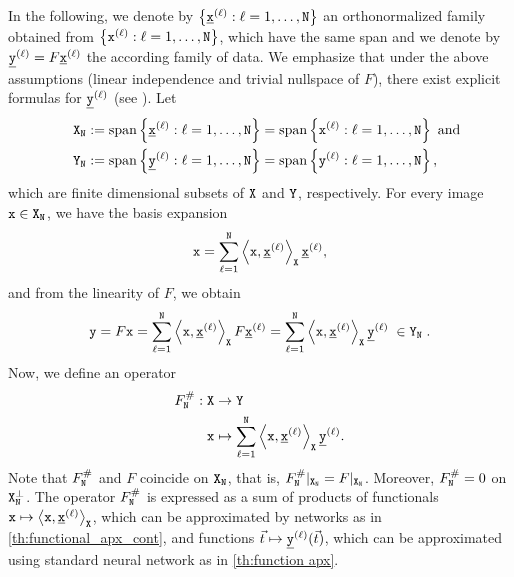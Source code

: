 \documentclass[10pt]{article}
\numberwithin{equation}{section}
\theoremstyle{nonumberplain}
\newcommand{\set}[1]{\left\{#1\right\}}
\newcommand{\inner}[2]{\left<#1,#2\right>}
\newcommand{\bt}{\vec{t}}
\newcommand{\X}{{\tt X}}
\newcommand{\Y}{{\tt Y}}
\newcommand{\y}{{\tt y}}
\newcommand{\x}{{\tt x}}
\newcommand{\ulx}{\underline{\x}}
\newcommand{\uly}{\underline{\y}}
\newcommand{\no}{{\tt N}}
\begin{document}
In the following, we denote by $\set{\ulx^{(\ell)}: \ell=1,\dots,\no}$ an orthonormalized family obtained from  $\set{\x^{(\ell)}: \ell=1,\dots,\no}$,  which have the same span and we denote by $\uly^{(\ell)} = F\ulx^{(\ell)}$ the according family of data. We emphasize that under the above assumptions (linear independence and trivial nullspace of $F$), there exist explicit formulas for $\uly^{(\ell)}$ (see \cite{AspKorSch20,AspBanOekSch20}).
Let 
	\begin{equation} \label{eq:sample}
		\begin{aligned}
			\X_\no &:= \text{span}\set{\ulx^{(\ell)}:\ell = 1,\dots,{\no}} = \text{span}\set{\x^{(\ell)}:\ell = 1,\dots,{\no}}
			\text{ and} \\ \quad \Y_\no &:= \text{span}\set{\uly^{(\ell)}:\ell = 1,\dots,{\no}}= \text{span}\set{\y^{(\ell)}:\ell = 1,\dots,{\no}},
		\end{aligned}
	\end{equation}
	which are finite dimensional subsets of $\X$ and $\Y$, respectively. For every image $\x \in \X_\no$, we have the basis expansion
	\begin{equation*}
		\x = \sum_{\ell=1}^\no \inner{\x}{\ulx^{(\ell)}}_\X \ulx^{(\ell)},
	\end{equation*}
	and from the linearity of $F$, we obtain
	\begin{equation*} 
		\y = F\x = \sum_{\ell=1}^\no \inner{\x}{\ulx^{(\ell)}}_\X F \ulx^{(\ell)} = 
		\sum_{\ell=1}^\no \inner{\x}{\ulx^{(\ell)}}_\X \uly^{(\ell)}\; \in \Y_\no\;.
	\end{equation*}
    Now, we define an operator
	\begin{equation} \label{eq:expansion}
		\begin{aligned}
			F_\no^\#: \X &\to \Y\;\\
			\x &\mapsto \sum_{\ell=1}^\no \inner{\x}{\ulx^{(\ell)}}_\X \uly^{(\ell)}.
		\end{aligned}
	\end{equation}
	Note that $F_\no^\#$ and $F$ coincide on $\X_\no$, that is, $F_\no^\#|_{\X_\no} = F|_{\X_\no}$. Moreover, $F_\no^\# = 0$ on $\X_\no^\perp$.
	The operator $F_\no^\#$ is expressed as a sum of products of functionals $\x \mapsto \inner{\x}{\ulx^{(\ell)}}_\X$, which can be approximated by networks as in \autoref{th:functional_apx_cont}, and functions
	$\bt \mapsto \uly^{(\ell)}(\bt)$, which can be approximated using standard neural network as in \autoref{th:function apx}.
	
\end{document}
